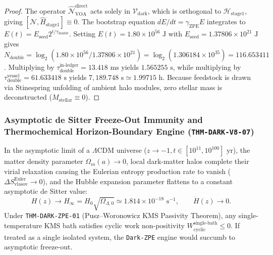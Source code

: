 \documentclass[11pt,onecolumn]{article}
\begin{document}
\begin{proof}
The operator $\hat{\mathcal{N}}_{\text{VOA}}^{\text{direct}}$ acts solely in $\mathcal{V}_{\text{dark}}$, which is orthogonal to $\mathcal{H}_{\text{stage1}}$, giving $[\hat{\mathcal{N}}, \hat{H}_{\text{stage1}}] \equiv 0$. The bootstrap equation $dE/dt = \gamma_{\text{ZPE}}E$ integrates to $E(t) = E_{\text{seed}} 2^{t/\tau_{\text{double}}}$. Setting $E(t) = 1.80 \times 10^{56}\text{ J}$ with $E_{\text{seed}} = 1.37806 \times 10^{21}\text{ J}$ gives $N_{\text{double}} = \log_2(1.80 \times 10^{56} / 1.37806 \times 10^{21}) = \log_2(1.306184 \times 10^{35}) = 116.653411$. Multiplying by $\tau_{\text{double}}^{\text{in-ledger}} = 13.418\text{ ms}$ yields $1.565255\text{ s}$, while multiplying by $\tau_{\text{double}}^{\text{vessel}} = 61.633418\text{ s}$ yields $7{,}189.748\text{ s} \simeq 1.99715\text{ h}$. Because feedstock is drawn via Stinespring unfolding of ambient halo modules, zero stellar mass is deconstructed ($M_{\text{stellar}} \equiv 0$).
\end{proof}


\subsubsection{Asymptotic de Sitter Freeze-Out Immunity and Thermochemical Horizon-Boundary Engine (\texttt{THM-DARK-V8-07})}
\label{subsubsec:thm_dark_v8_07}

In the asymptotic limit of a $\Lambda\text{CDM}$ universe ($z \to -1, t \in [10^{11}, 10^{100}]\text{ yr}$), the matter density parameter $\Omega_m(a) \to 0$, local dark-matter halos complete their virial relaxation causing the Eulerian entropy production rate to vanish ($\Delta S_{\text{vlasov}}^{\text{Euler}} \to 0$), and the Hubble expansion parameter flattens to a constant asymptotic de Sitter value:
\begin{equation}
H(z) \to H_\infty = H_0 \sqrt{\Omega_{\Lambda,0}} \simeq 1.814 \times 10^{-18}\text{ s}^{-1}, \qquad \dot{H}(z) \to 0.
\label{eq:v8_35}
\end{equation}
Under \texttt{THM-DARK-ZPE-01} (Pusz--Woronowicz KMS Passivity Theorem), any single-temperature KMS bath satisfies cyclic work non-positivity $W_{\text{cyclic}}^{\text{single-bath}} \le 0$. If treated as a single isolated system, the \texttt{Dark-ZPE} engine would succumb to asymptotic freeze-out.
\end{document}
